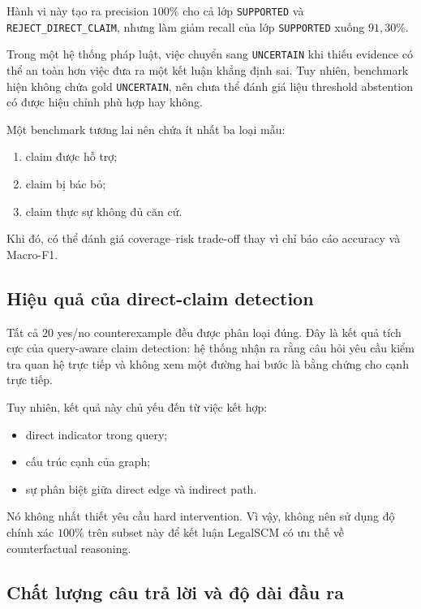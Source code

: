 Hành vi này tạo ra precision \(100\%\) cho cả lớp \texttt{SUPPORTED} và
\texttt{REJECT\_DIRECT\_CLAIM}, nhưng làm giảm recall của lớp
\texttt{SUPPORTED} xuống \(91{,}30\%\).

Trong một hệ thống pháp luật, việc chuyển sang \texttt{UNCERTAIN} khi thiếu
evidence có thể an toàn hơn việc đưa ra một kết luận khẳng định sai. Tuy
nhiên, benchmark hiện không chứa gold \texttt{UNCERTAIN}, nên chưa thể đánh
giá liệu threshold abstention có được hiệu chỉnh phù hợp hay không.

Một benchmark tương lai nên chứa ít nhất ba loại mẫu:

\begin{enumerate}
    \item claim được hỗ trợ;
    \item claim bị bác bỏ;
    \item claim thực sự không đủ căn cứ.
\end{enumerate}

Khi đó, có thể đánh giá coverage--risk trade-off thay vì chỉ báo cáo
accuracy và Macro-F1.

\subsection{Hiệu quả của direct-claim detection}

Tất cả \(20\) yes/no counterexample đều được phân loại đúng. Đây là kết quả
tích cực của query-aware claim detection: hệ thống nhận ra rằng câu hỏi yêu
cầu kiểm tra quan hệ trực tiếp và không xem một đường hai bước là bằng chứng
cho cạnh trực tiếp.

Tuy nhiên, kết quả này chủ yếu đến từ việc kết hợp:

\begin{itemize}
    \item direct indicator trong query;
    \item cấu trúc cạnh của graph;
    \item sự phân biệt giữa direct edge và indirect path.
\end{itemize}

Nó không nhất thiết yêu cầu hard intervention. Vì vậy, không nên sử dụng độ
chính xác \(100\%\) trên subset này để kết luận LegalSCM có ưu thế về
counterfactual reasoning.

\subsection{Chất lượng câu trả lời và độ dài đầu ra}

